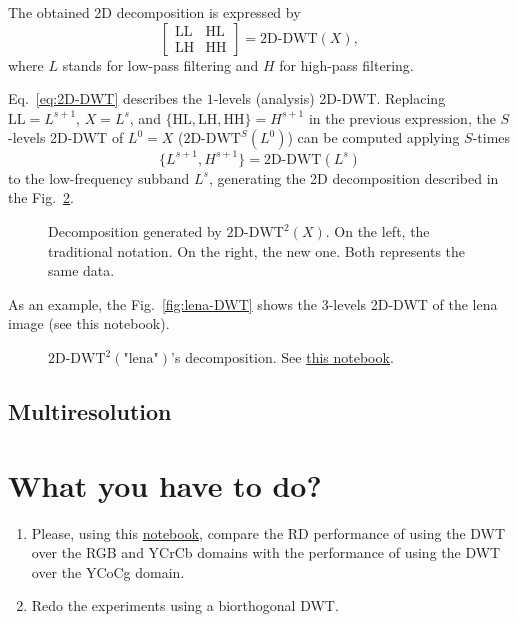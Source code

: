 The obtained 2D decomposition is expressed by
\begin{equation}
  \begin{bmatrix}
    \text{LL} & \text{HL} \\
    \text{LH} & \text{HH}
  \end{bmatrix}
  =
  \text{2D-DWT}(X),
  \label{eq:2D-DWT}
\end{equation}
where $L$ stands for low-pass filtering and $H$ for high-pass
filtering.

Eq.~\ref{eq:2D-DWT} describes the $1$-levels (analysis)
2D-DWT. Replacing $\text{LL}=L^{s+1}$, $X=L^s$, and
$\{\text{HL}, \text{LH}, \text{HH}\}=H^{s+1}$ in the previous
expression, the $S$-levels 2D-DWT of $L^0=X$ ($\text{2D-DWT}^S(L^0)$)
can be computed applying $S$-times
\begin{equation}
  \{L^{s+1}, H^{s+1}\} = \text{2D-DWT}(L^s)
\end{equation}
to the low-frequency subband $L^s$, generating the 2D decomposition
described in the Fig.~\ref{fig:2D-DWT}.

\begin{figure}
  \centering
  \caption{Decomposition generated by $\text{2D-DWT}^2(X)$. On the
    left, the traditional notation. On the right, the new one. Both
    represents the same data.}
  \label{fig:2D-DWT}
\end{figure}

As an example, the Fig.~\ref{fig:lena-DWT} shows the $3$-levels
2D-DWT of the lena image (see this notebook).

\begin{figure}
  \centering
  \caption{$\text{2D-DWT}^2(\text{"lena"})$'s decomposition. See
    \href{https://github.com/Sistemas-Multimedia/Sistemas-Multimedia.github.io/blob/master/study_guide/06-2D-DWT/dwt_lena.ipynb}{this
      notebook}.}
  \label{fig:2D-DWT}
\end{figure}

\subsection{Multiresolution}

\section{What you have to do?}

\begin{enumerate}
\item Please, using this
  \href{https://github.com/Sistemas-Multimedia/Sistemas-Multimedia.github.io/blob/master/study_guide/07-DWT/performance.ipynb}{notebook},
  compare the RD performance of using the DWT over the RGB and YCrCb
  domains with the performance of using the DWT over the YCoCg domain.
\item Redo the experiments using a biorthogonal DWT.
\end{enumerate}

